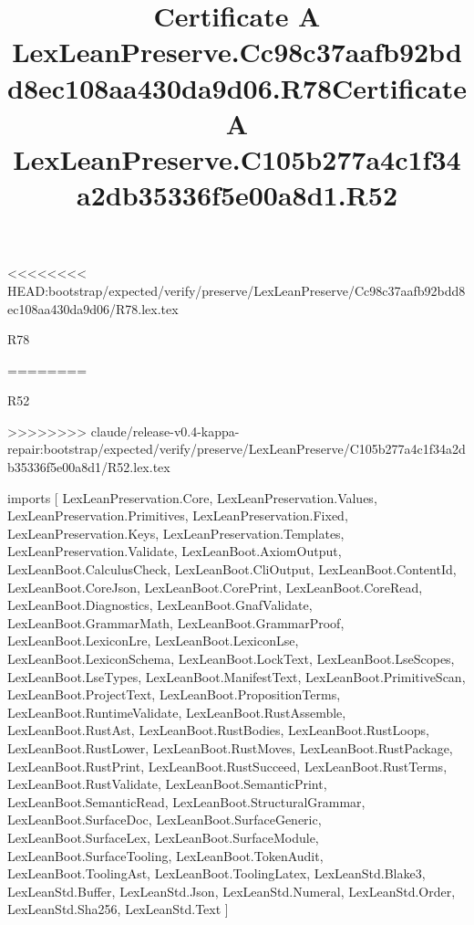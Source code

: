 <<<<<<<< HEAD:bootstrap/expected/verify/preserve/LexLeanPreserve/Cc98c37aafb92bdd8ec108aa430da9d06/R78.lex.tex
\begin{lexlean}{R78}
\title{Certificate A LexLeanPreserve.Cc98c37aafb92bdd8ec108aa430da9d06.R78}
========
\begin{lexlean}{R52}
\title{Certificate A LexLeanPreserve.C105b277a4c1f34a2db35336f5e00a8d1.R52}
>>>>>>>> claude/release-v0.4-kappa-repair:bootstrap/expected/verify/preserve/LexLeanPreserve/C105b277a4c1f34a2db35336f5e00a8d1/R52.lex.tex
\begin{coremodule}
imports [
  LexLeanPreservation.Core,
  LexLeanPreservation.Values,
  LexLeanPreservation.Primitives,
  LexLeanPreservation.Fixed,
  LexLeanPreservation.Keys,
  LexLeanPreservation.Templates,
  LexLeanPreservation.Validate,
  LexLeanBoot.AxiomOutput,
  LexLeanBoot.CalculusCheck,
  LexLeanBoot.CliOutput,
  LexLeanBoot.ContentId,
  LexLeanBoot.CoreJson,
  LexLeanBoot.CorePrint,
  LexLeanBoot.CoreRead,
  LexLeanBoot.Diagnostics,
  LexLeanBoot.GnafValidate,
  LexLeanBoot.GrammarMath,
  LexLeanBoot.GrammarProof,
  LexLeanBoot.LexiconLre,
  LexLeanBoot.LexiconLse,
  LexLeanBoot.LexiconSchema,
  LexLeanBoot.LockText,
  LexLeanBoot.LseScopes,
  LexLeanBoot.LseTypes,
  LexLeanBoot.ManifestText,
  LexLeanBoot.PrimitiveScan,
  LexLeanBoot.ProjectText,
  LexLeanBoot.PropositionTerms,
  LexLeanBoot.RuntimeValidate,
  LexLeanBoot.RustAssemble,
  LexLeanBoot.RustAst,
  LexLeanBoot.RustBodies,
  LexLeanBoot.RustLoops,
  LexLeanBoot.RustLower,
  LexLeanBoot.RustMoves,
  LexLeanBoot.RustPackage,
  LexLeanBoot.RustPrint,
  LexLeanBoot.RustSucceed,
  LexLeanBoot.RustTerms,
  LexLeanBoot.RustValidate,
  LexLeanBoot.SemanticPrint,
  LexLeanBoot.SemanticRead,
  LexLeanBoot.StructuralGrammar,
  LexLeanBoot.SurfaceDoc,
  LexLeanBoot.SurfaceGeneric,
  LexLeanBoot.SurfaceLex,
  LexLeanBoot.SurfaceModule,
  LexLeanBoot.SurfaceTooling,
  LexLeanBoot.TokenAudit,
  LexLeanBoot.ToolingAst,
  LexLeanBoot.ToolingLatex,
  LexLeanStd.Blake3,
  LexLeanStd.Buffer,
  LexLeanStd.Json,
  LexLeanStd.Numeral,
  LexLeanStd.Order,
  LexLeanStd.Sha256,
  LexLeanStd.Text
]


\end{coremodule}
\end{lexlean}
\end{lexlean}
